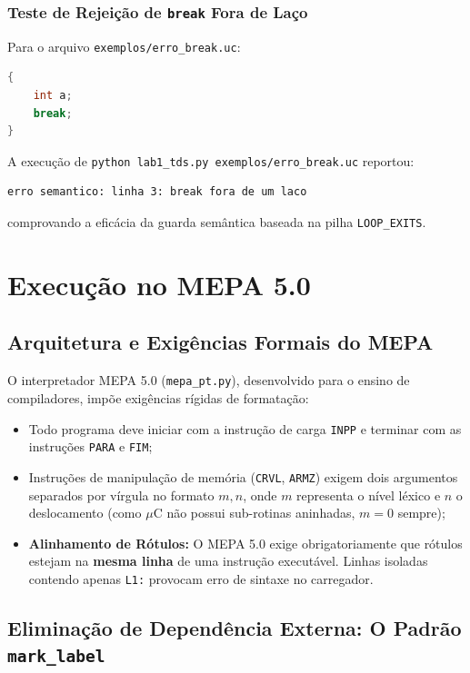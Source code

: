 \documentclass[12pt,a4paper]{article}
\begin{document}
\subsubsection{Teste de Rejeição de \texttt{break} Fora de Laço}

Para o arquivo \texttt{exemplos/erro\_break.uc}:
\begin{lstlisting}[language=C]
{
    int a;
    break;
}
\end{lstlisting}

A execução de \texttt{python lab1\_tds.py exemplos/erro\_break.uc} reportou:
\begin{lstlisting}
erro semantico: linha 3: break fora de um laco
\end{lstlisting}
comprovando a eficácia da guarda semântica baseada na pilha \texttt{LOOP\_EXITS}.

\section{Execução no MEPA 5.0}

\subsection{Arquitetura e Exigências Formais do MEPA}

O interpretador MEPA 5.0 (\texttt{mepa\_pt.py}), desenvolvido para o ensino de
compiladores, impõe exigências rígidas de formatação:
\begin{itemize}
    \item Todo programa deve iniciar com a instrução de carga \texttt{INPP} e
          terminar com as instruções \texttt{PARA} e \texttt{FIM};
    \item Instruções de manipulação de memória (\texttt{CRVL}, \texttt{ARMZ}) exigem
          dois argumentos separados por vírgula no formato $m,n$, onde $m$ representa
          o nível léxico e $n$ o deslocamento (como $\mu$C não possui sub-rotinas
          aninhadas, $m=0$ sempre);
    \item \textbf{Alinhamento de Rótulos:} O MEPA 5.0 exige obrigatoriamente que
          rótulos estejam na \textbf{mesma linha} de uma instrução executável. Linhas
          isoladas contendo apenas \texttt{L1:} provocam erro de sintaxe no carregador.
\end{itemize}

\subsection{Eliminação de Dependência Externa: O Padrão \texttt{mark\_label}}
\end{document}
